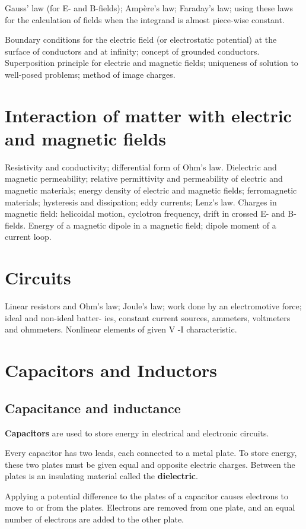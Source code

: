 Gauss’ law (for E- and B-fields); Ampère’s law; Faraday’s law; using these laws for the calculation of fields when the integrand is almost piece-wise constant. 

Boundary conditions for the electric field (or electrostatic potential) at the surface of conductors and at infinity; concept of grounded conductors. 
Superposition principle for electric and magnetic fields; uniqueness of solution to well-posed problems; method of image charges.
\pagebreak

\chapter{Interaction of matter with electric and magnetic fields}
Resistivity and conductivity; differential form of Ohm’s law. 
Dielectric and magnetic permeability; relative permittivity and permeability of electric and magnetic materials; energy density of electric and magnetic fields; ferromagnetic materials; hysteresis and dissipation; eddy currents; Lenz’s law. 
Charges in magnetic field: helicoidal motion, cyclotron frequency, drift in crossed E- and B-fields. 
Energy of a magnetic dipole in a magnetic field; dipole moment of a current loop.
\pagebreak

\chapter{Circuits}
Linear resistors and Ohm’s law; Joule’s law; work done
by an electromotive force; ideal and non-ideal batter-
ies, constant current sources, ammeters, voltmeters and
ohmmeters. Nonlinear elements of given V -I characteristic. 

\chapter{Capacitors and Inductors}
\section{Capacitance and inductance}
\textbf{Capacitors} are used to store energy in electrical and electronic circuits. 

Every capacitor has two leads, each connected to a metal plate. To store energy, these two plates must be given equal and opposite electric charges. Between the plates is an insulating material called the \textbf{dielectric}.

Applying a potential difference to the plates of a capacitor causes electrons to move to or from the plates. Electrons are removed from one plate, and an equal number of electrons are added to the other plate.

